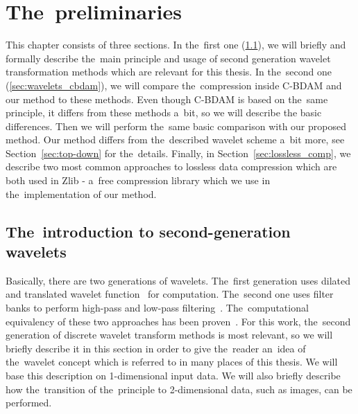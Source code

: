 \chapter{The~preliminaries}\label{chap:preliminaries}

This chapter consists of three sections. In the~first one (\ref{sec:wavelets}), we will briefly and formally describe the~main principle and usage of second generation wavelet transformation methods which are relevant for this thesis. In the~second one (\ref{sec:wavelets_cbdam}), we will compare the~compression inside C-BDAM and our method to these methods. Even though C-BDAM is based on the~same principle, it differs from these methods a~bit, so we will describe the basic differences. Then we will perform the~same basic comparison with our proposed method. Our method differs from the~described wavelet scheme a~bit more, see Section~\ref{sec:top-down} for the~details. Finally, in Section~\ref{sec:lossless_comp}, we describe two most common approaches to lossless data compression which are both used in Zlib - a~free compression library which we use in the~implementation of our method.

\section{The~introduction to second-generation wavelets}\label{sec:wavelets}
Basically, there are two generations of wavelets. The~first generation uses dilated and translated wavelet function~\cite{waveletsTutorial} for computation. The~second one uses filter banks to perform high-pass and low-pass filtering~\cite{waveletsLifting}. The~computational equivalency of these two approaches has been proven~\cite{waveletsEquiv}. For this work, the~second generation of discrete wavelet transform methods is most relevant, so we will briefly describe it in this section in order to give the~reader an~idea of the~wavelet concept which is referred to in many places of this thesis. We will base this description on 1-dimensional input data. We will also briefly describe how the~transition of the~principle to 2-dimensional data, such as images, can be performed.

